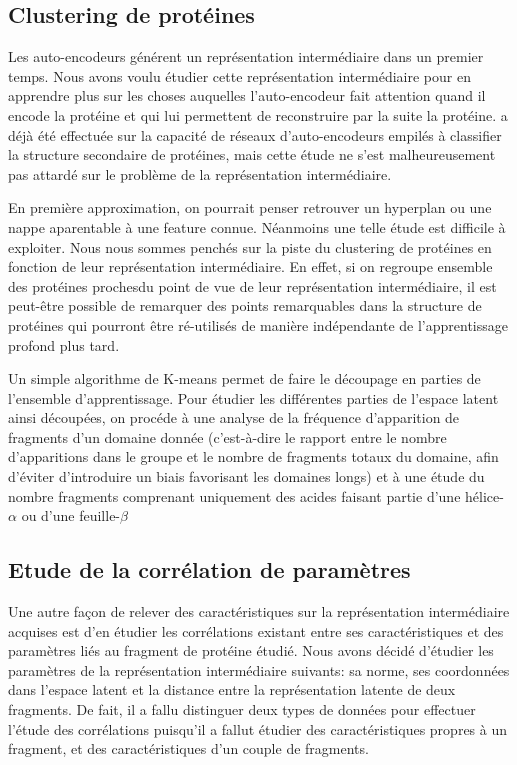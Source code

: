 \documentclass[a4paper, 11pt, onecolumn]{article}
\begin{document}
\subsection{Clustering de protéines}

Les auto-encodeurs générent un représentation intermédiaire dans un premier
temps. Nous avons voulu étudier cette représentation intermédiaire pour en
apprendre plus sur les choses auquelles l'auto-encodeur fait attention quand il
encode la protéine et qui lui permettent de reconstruire par la suite la
protéine. \cite{jian2013predicting} a déjà été effectuée sur la capacité de réseaux d'auto-encodeurs
empilés à classifier la structure secondaire de protéines, mais cette étude ne
s'est malheureusement pas attardé sur le problème de la représentation intermédiaire.

En première approximation, on pourrait penser retrouver un hyperplan ou une
nappe aparentable à une feature connue. Néanmoins une telle étude est difficile
à exploiter. Nous nous sommes penchés sur la piste du clustering
de protéines en fonction de leur représentation intermédiaire. En effet, si on
regroupe ensemble des protéines \og proches\fg du point de vue de leur
représentation intermédiaire, il est peut-être possible de remarquer
des points remarquables dans la structure de protéines qui pourront être
ré-utilisés de manière indépendante de l'apprentissage profond plus tard.

Un simple algorithme de K-means permet de faire le découpage en parties de
l'ensemble d'apprentissage. Pour étudier les différentes parties de l'espace
latent ainsi découpées, on procéde à une analyse de la fréquence d'apparition de
fragments d'un domaine donnée (c'est-à-dire le rapport entre le nombre
d'apparitions dans le groupe et le nombre de fragments totaux du domaine, afin
d'éviter d'introduire un biais favorisant les domaines longs) et à une étude du
nombre fragments comprenant uniquement des acides faisant partie d'une
hélice-$\alpha$ ou d'une feuille-$\beta$

\subsection{Etude de la corrélation de paramètres}

Une autre façon de relever des caractéristiques sur la représentation
intermédiaire acquises est d'en étudier les corrélations existant entre ses
caractéristiques et des paramètres liés au fragment de protéine étudié. Nous
avons décidé d'étudier les paramètres de la représentation intermédiaire
suivants: sa norme, ses coordonnées dans l'espace latent et la distance entre la
représentation latente de deux fragments. De fait, il a fallu distinguer deux
types de données pour effectuer l'étude des corrélations puisqu'il a fallut
étudier des caractéristiques propres à un fragment, et des caractéristiques
d'un couple de fragments.
\end{document}
